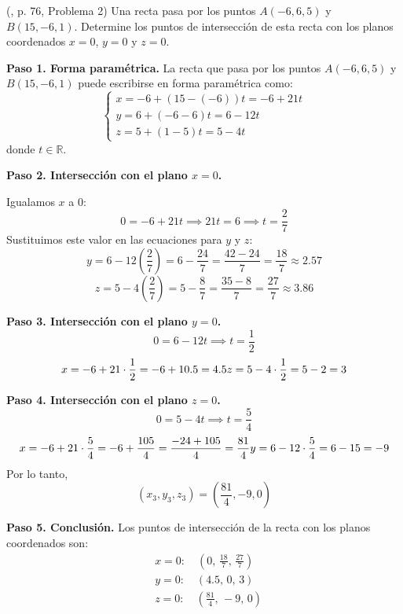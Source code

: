 \begin{prob} (\cite{espinoza2006Algebralineal}, p. 76, Problema 2) Una recta pasa por los puntos $A(-6,6,5)$ y $B(15,-6,1)$. Determine los puntos de intersección de esta recta con los planos coordenados $x=0$, $y=0$ y $z=0$. 

\begin{myproof}
\textbf{Paso 1. Forma paramétrica.} La recta que pasa por los puntos $A(-6,6,5)$ y $B(15,-6,1)$ puede escribirse en forma paramétrica como:
\[
\begin{cases}
x = -6 + (15 - (-6))t = -6 + 21t \\
y = 6 + (-6 - 6)t = 6 - 12t \\
z = 5 + (1 - 5)t = 5 - 4t
\end{cases}
\]
donde $t \in \mathbb{R}$.

\textbf{Paso 2. Intersección con el plano $x=0$.}

Igualamos $x$ a $0$:
\[
0 = -6 + 21t \implies 21t = 6 \implies t = \frac{2}{7}
\]
Sustituimos este valor en las ecuaciones para $y$ y $z$:
\[
y = 6 - 12\left(\frac{2}{7}\right) = 6 - \frac{24}{7} = \frac{42 - 24}{7} = \frac{18}{7} \approx 2.57
\]
\[
z = 5 - 4\left(\frac{2}{7}\right) = 5 - \frac{8}{7} = \frac{35 - 8}{7} = \frac{27}{7} \approx 3.86
\]



\textbf{Paso 3. Intersección con el plano $y=0$.}
\[
0 = 6 - 12t \implies t = \frac{1}{2}
\]
\[
x = -6 + 21 \cdot \frac{1}{2} = -6 + 10.5 = 4.5 \\
z = 5 - 4 \cdot \frac{1}{2} = 5 - 2 = 3
\]


\textbf{Paso 4. Intersección con el plano $z=0$.}
\[
0 = 5 - 4t \implies t = \frac{5}{4}
\]
\[
x = -6 + 21 \cdot \frac{5}{4} = -6 + \frac{105}{4} = \frac{-24 + 105}{4} = \frac{81}{4} \\
y = 6 - 12 \cdot \frac{5}{4} = 6 - 15 = -9
\]
Por lo tanto,
\[
(x_3, y_3, z_3) = \left( \frac{81}{4}, -9, 0 \right)
\]

\textbf{Paso 5. Conclusión.} Los puntos de intersección de la recta con los planos coordenados son:
\[
\boxed{
\begin{aligned}
&x=0: \quad (0,\, \frac{18}{7},\, \frac{27}{7}) \\
&y=0: \quad (4.5,\, 0,\, 3) \\
&z=0: \quad \left(\frac{81}{4},\, -9,\, 0\right)
\end{aligned}
}
\]

\end{myproof}

\end{prob}

